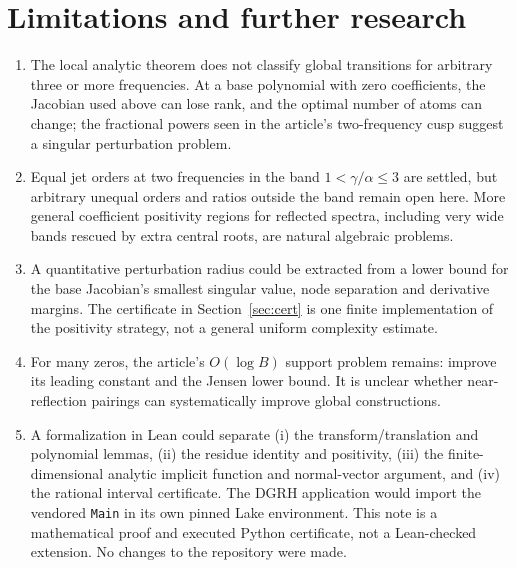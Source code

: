 \documentclass[11pt]{article}
\theoremstyle{remark}\newtheorem{remark}[theorem]{Remark}
\begin{document}
\section{Limitations and further research}
\begin{enumerate}
\item The local analytic theorem does not classify global transitions for arbitrary three or more frequencies. At a base polynomial with zero coefficients, the Jacobian used above can lose rank, and the optimal number of atoms can change; the fractional powers seen in the article's two-frequency cusp suggest a singular perturbation problem.
\item Equal jet orders at two frequencies in the band $1<\gamma/\alpha\le3$ are settled, but arbitrary unequal orders and ratios outside the band remain open here. More general coefficient positivity regions for reflected spectra, including very wide bands rescued by extra central roots, are natural algebraic problems.
\item A quantitative perturbation radius could be extracted from a lower bound for the base Jacobian's smallest singular value, node separation and derivative margins. The certificate in Section~\ref{sec:cert} is one finite implementation of the positivity strategy, not a general uniform complexity estimate.
\item For many zeros, the article's $O(\log B)$ support problem remains: improve its leading constant and the Jensen lower bound. It is unclear whether near-reflection pairings can systematically improve global constructions.
\item A formalization in Lean could separate (i) the transform/translation and polynomial lemmas, (ii) the residue identity and positivity, (iii) the finite-dimensional analytic implicit function and normal-vector argument, and (iv) the rational interval certificate. The DGRH application would import the vendored \texttt{Main} in its own pinned Lake environment. This note is a mathematical proof and executed Python certificate, not a Lean-checked extension. No changes to the repository were made.
\end{enumerate}
\end{document}

